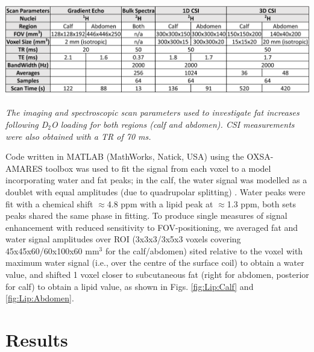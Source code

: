 \begin{table}
    \centering
    \includegraphics[width=1\textwidth]{Figures/Lipid/Scan_Details.png}
    \caption{\textit{The imaging and spectroscopic scan parameters used to investigate fat increases following D$_2$O loading for both regions (calf and abdomen). CSI measurements were also obtained with a \ac{TR} of 70 ms.}}
    \label{fig:Lip:Scan_Detail}
\end{table}

Code written in MATLAB (MathWorks, Natick, USA) using the OXSA-AMARES \cite{Purvis2017OXSA:MATLAB} toolbox was used to fit the signal from each voxel to a model incorporating water and fat peaks; in the calf, the water signal was modelled as a doublet with equal amplitudes (due to quadrupolar splitting) \cite{Gursan2022ResidualMuscle}. Water peaks were fit with a chemical shift $\approx$4.8 ppm with a lipid peak at $\approx$1.3 ppm, both sets peaks shared the same phase in fitting. To produce single measures of signal enhancement with reduced sensitivity to \ac{FOV}-positioning, we averaged fat and water signal amplitudes over \ac{ROI} (3x3x3/3x5x3 voxels covering 45x45x60/60x100x60 mm$^3$ for the calf/abdomen) sited relative to the voxel with maximum water signal (i.e., over the centre of the surface coil) to obtain a water value, and shifted 1 voxel closer to subcutaneous fat (right for abdomen, posterior for calf) to obtain a lipid value, as shown in Figs. \ref{fig:Lip:Calf} and \ref{fig:Lip:Abdomen}.

\section{Results}


